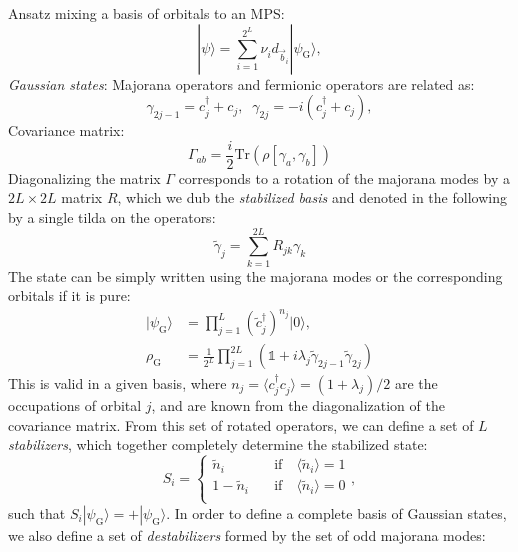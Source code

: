 \documentclass[a4paper, twocolumn, superscriptaddress, longbibliography]{revtex4-2}
\begin{document}
	Ansatz mixing a basis of orbitals to an MPS:
	\begin{equation}
		|\psi \rangle = \sum_{i=1}^{2^{L}} \nu_i^{} d_{\vec{b}_i}^{} |\psi_{\mathrm{G}}^{}\rangle,
	\end{equation}
	\emph{Gaussian states}:
	Majorana operators and fermionic operators are related as:
	\begin{equation}
		\gamma_{2j-1} = c^{\dagger}_{j} + c_{j}, \;\;
		\gamma_{2j} = -i ( c^{\dagger}_{j} + c_{j}),
	\end{equation}
	Covariance matrix: 
	\begin{equation}
		\Gamma_{ab}^{} = \frac{i}{2} \mathrm{Tr}\left(\rho[\gamma_a^{},\gamma_b^{}] \right)
	\end{equation}
	Diagonalizing the matrix $\Gamma$ corresponds to a rotation of the majorana modes by a $2L\times2L$ matrix $R$, which we dub the \emph{stabilized basis} and denoted in the following by a single tilda on the operators:
	\begin{equation}
		\tilde{\gamma}_j = \sum_{k=1}^{2L} R_{jk}\gamma_{k}
	\end{equation}
	The state can be simply written using the majorana modes or the corresponding orbitals if it is pure:
	\begin{equation}
		\begin{split}
			|\psi_{\mathrm{G}}\rangle &= \prod_{j=1}^{L}\left(\tilde{c}_{j}^{\dagger}\right)^{n_j}|0\rangle, \\
			\rho_{\mathrm{G}}^{} &= \frac{1}{2^{L}}\prod\limits_{j=1}^{2L}\left(\mathds{1} + i\lambda_{j} \tilde{\gamma}_{2j-1}^{} \tilde{\gamma}_{2j}^{} \right)
		\end{split}
	\end{equation}
	This is valid in a given basis, where $n_j=\langle c^{\dagger}_j c^{}_j\rangle=(1+\lambda_j)/2$ are the occupations of orbital $j$, and are known from the diagonalization of the covariance matrix. From this set of rotated operators, we can define a set of $L$ \emph{stabilizers}, which together completely determine the stabilized state:
	\begin{equation}
		S_{i} = 
		\begin{cases}
			\tilde{n}_i \quad &\text{if} \quad \langle \tilde{n}_i \rangle = 1 \\
			1 - \tilde{n}_i \quad &\text{if} \quad \langle \tilde{n}_i \rangle = 0 \\
 		\end{cases},
	\end{equation}
	such that $S_i|\psi_{\mathrm{G}}\rangle = +|\psi_{\mathrm{G}}\rangle$.  In order to define a complete basis of Gaussian states, we also define a set of \emph{destabilizers} formed by the set of odd majorana modes:
\end{document}
